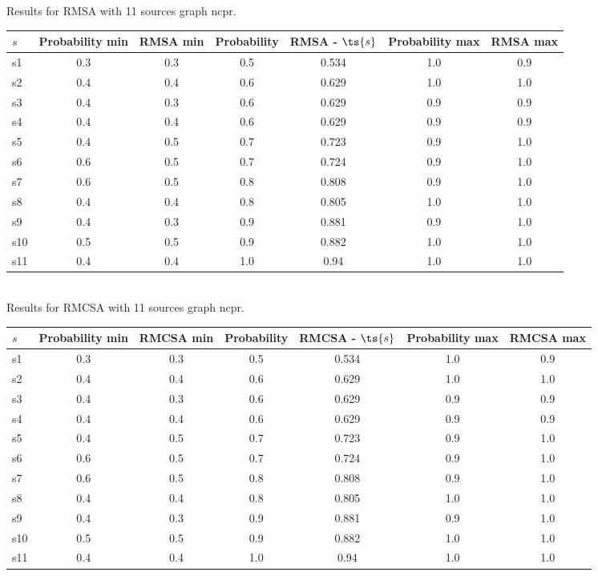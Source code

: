 \documentclass{article}
\begin{document}
\noindent Results for RMSA with 11 sources graph ncpr.

\noindent\begin{tabular}{|l|c|c|c|c|c|c|}
\hline
$s$& Probability min & RMSA min & Probability & RMSA - $\ts{s}$ & Probability max & RMSA max\\
\hline
s1 &0.3 & 0.3 & 0.5 & 0.534 & 1.0 & 0.9\\
\hline
s2 &0.4 & 0.4 & 0.6 & 0.629 & 1.0 & 1.0\\
\hline
s3 &0.4 & 0.3 & 0.6 & 0.629 & 0.9 & 0.9\\
\hline
s4 &0.4 & 0.4 & 0.6 & 0.629 & 0.9 & 0.9\\
\hline
s5 &0.4 & 0.5 & 0.7 & 0.723 & 0.9 & 1.0\\
\hline
s6 &0.6 & 0.5 & 0.7 & 0.724 & 0.9 & 1.0\\
\hline
s7 &0.6 & 0.5 & 0.8 & 0.808 & 0.9 & 1.0\\
\hline
s8 &0.4 & 0.4 & 0.8 & 0.805 & 1.0 & 1.0\\
\hline
s9 &0.4 & 0.3 & 0.9 & 0.881 & 0.9 & 1.0\\
\hline
s10 &0.5 & 0.5 & 0.9 & 0.882 & 1.0 & 1.0\\
\hline
s11 &0.4 & 0.4 & 1.0 & 0.94 & 1.0 & 1.0\\
\hline
\end{tabular}\\

\noindent Results for RMCSA with 11 sources graph ncpr.

\noindent\begin{tabular}{|l|c|c|c|c|c|c|}
\hline
$s$& Probability min & RMCSA min & Probability & RMCSA - $\ts{s}$ & Probability max & RMCSA max\\
\hline
s1 &0.3 & 0.3 & 0.5 & 0.534 & 1.0 & 0.9\\
\hline
s2 &0.4 & 0.4 & 0.6 & 0.629 & 1.0 & 1.0\\
\hline
s3 &0.4 & 0.3 & 0.6 & 0.629 & 0.9 & 0.9\\
\hline
s4 &0.4 & 0.4 & 0.6 & 0.629 & 0.9 & 0.9\\
\hline
s5 &0.4 & 0.5 & 0.7 & 0.723 & 0.9 & 1.0\\
\hline
s6 &0.6 & 0.5 & 0.7 & 0.724 & 0.9 & 1.0\\
\hline
s7 &0.6 & 0.5 & 0.8 & 0.808 & 0.9 & 1.0\\
\hline
s8 &0.4 & 0.4 & 0.8 & 0.805 & 1.0 & 1.0\\
\hline
s9 &0.4 & 0.3 & 0.9 & 0.881 & 0.9 & 1.0\\
\hline
s10 &0.5 & 0.5 & 0.9 & 0.882 & 1.0 & 1.0\\
\hline
s11 &0.4 & 0.4 & 1.0 & 0.94 & 1.0 & 1.0\\
\hline
\end{tabular}\\
\end{document}
